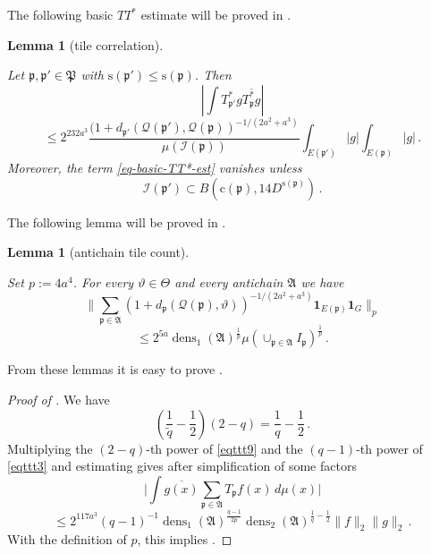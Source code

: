 \documentclass[10pt,a4paper]{article}
\theoremstyle{plain}
\newtheorem{lemma}[theorem]{Lemma}
\theoremstyle{definition}
\numberwithin{equation}{subsection}
\DeclareMathOperator{\dens}{\operatorname{dens}}
\newcommand{\fp}{{\mathfrak p}}
\newcommand{\fP}{{\mathfrak P}}
\newcommand{\pc}{{\mathrm{c}}}
\newcommand{\ps}{{\mathrm{s}}}
\newcommand{\scI}{{\mathcal{I}}} %
\newcommand{\mfa}{{\vartheta}}
\newcommand{\Mf}{{\Theta}}
\newcommand{\fcc}{{\mathcal{Q}}}
\newcommand{\lean}[1]{}
\newcommand{\proves}[1]{}
\newcommand{\uses}[1]{}
\newcommand{\leanok}{}
\begin{document}
The following basic $TT^*$ estimate will be proved in .
\begin{lemma}[tile correlation]
    \label{tile-correlation}
    \leanok
    \lean{Tile.correlation_le, Tile.correlation_zero_of_ne_subset}
    \uses{Holder-van-der-Corput,correlation-kernel-bound,tile-uncertainty,tile-range-support}
    Let $\fp, \fp'\in \fP$ with
    $\ps({\fp'})\leq \ps({\fp})$.
    Then
    \begin{equation}
        \label{eq-basic-TT*-est}
        \left|\int T^*_{\fp'}g\overline{T^*_{\fp}g}\right|
    \end{equation}
    \begin{equation}
        \le 2^{232a^3}\frac{(1+d_{\fp'}(\fcc(\fp'), \fcc(\fp))^{-1/(2a^2+a^3)}}{\mu(\scI(\fp))}\int_{E(\fp')}|g|\int_{E(\fp)}|g|\,.
    \end{equation}
    Moreover, the term \eqref{eq-basic-TT*-est} vanishes unless
    \begin{equation}
        \scI(\fp') \subset B(\pc(\fp), 14D^{\ps(\fp)})\, .
    \end{equation}
\end{lemma}

The following lemma will be proved in .
\begin{lemma}[antichain tile count]
    \label{antichain-tile-count}
\leanok
\lean{Antichain.tile_count}
    \uses{global-antichain-density}
    Set $p:=4a^4$. For every $\mfa\in\Mf$ and every antichain $\mathfrak{A}$ we have
    \begin{equation}
        \label{eq-antichain-Lp}
        \Big\|\sum_{\fp\in\mathfrak{A}}(1+d_{\fp}(\fcc(\fp), \mfa))^{-1/(2a^2+a^3)}\mathbf{1}_{E(\fp)}\mathbf{1}_G\Big\|_{p}
    \end{equation}
    \begin{equation}
        \le
        2^{5a}\dens_1(\mathfrak{A})^{\frac 1p}\mu\left(\cup_{\fp\in\mathfrak{A}}I_{\fp}\right)^{\frac 1p}\, .
    \end{equation}
\end{lemma}

From these lemmas it is easy to prove .
\begin{proof}[Proof of ]
\proves{antichain-operator}
\leanok
We have
\begin{equation}
    \left(\frac 1{\tilde{q}} -\frac 12\right) (2-q)= \frac 1q -\frac 12\,.
\end{equation}
Multiplying the $(2-q)$-th power of \eqref{eqttt9} and the $(q-1)$-th power of \eqref{eqttt3}
and estimating gives after simplification of some factors
\begin{equation}\label{eqttt8}
    \Big|\int \overline{g(x)} \sum_{\fp \in \mathfrak{A}} T_{\fp} f(x)\, d\mu(x)\Big|
\end{equation}
 \begin{equation}
    \le 2^{117a^3}(q-1)^{-1} \dens_1(\mathfrak{A})^{\frac {q-1}{2p}}\dens_2(\mathfrak{A})^{\frac 1{q}-\frac 12} \|f\|_2\|g\|_2\, .
\end{equation}
With the definition of $p$, this implies
.
\end{proof}
\end{document}
